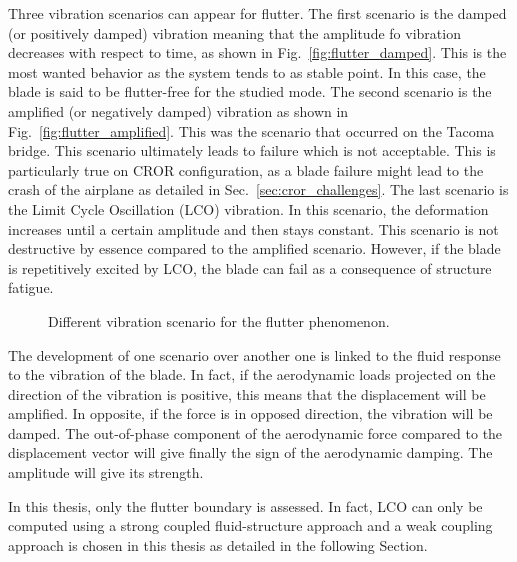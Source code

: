 Three vibration scenarios can appear for flutter.
The first scenario is the damped (or positively damped) 
vibration meaning
that the amplitude fo vibration decreases with respect to time, 
as shown in Fig.~\ref{fig:flutter_damped}.
This is the most wanted behavior as the system tends to
as stable point. In this case, the blade is said to
be flutter-free for the studied mode.
The second scenario is the amplified (or negatively damped)
vibration as shown in Fig.~\ref{fig:flutter_amplified}. 
This was the scenario that occurred on the Tacoma bridge. 
This scenario ultimately
leads to failure which is not acceptable. This is particularly true
on CROR configuration, as a blade failure might lead to 
the crash of the airplane as detailed in Sec.~\ref{sec:cror_challenges}.
The last scenario is the Limit Cycle Oscillation (LCO) vibration.
In this scenario, the deformation increases until a certain 
amplitude and then stays constant. This scenario is not
destructive by essence compared to the amplified scenario. However,
if the blade is repetitively excited by LCO, the blade
can fail as a consequence of structure fatigue.
\begin{figure}[htp]
  \centering
  \caption{Different vibration scenario for the flutter phenomenon.}
\end{figure}

The development of one scenario over another one is linked to
the fluid response to the vibration of the blade. In fact,
if the aerodynamic loads projected on the direction of the vibration
is positive, this means that the displacement will be amplified. 
In opposite, if the force is in opposed direction, the vibration will be damped.
The out-of-phase component of the aerodynamic force compared to
the displacement vector will give finally the sign of the aerodynamic damping.
The amplitude will give its strength. 

In this thesis, only the flutter boundary is assessed. In fact,
LCO can only be computed using a strong coupled fluid-structure 
approach and a weak coupling approach is chosen in this thesis
as detailed in the following Section.
